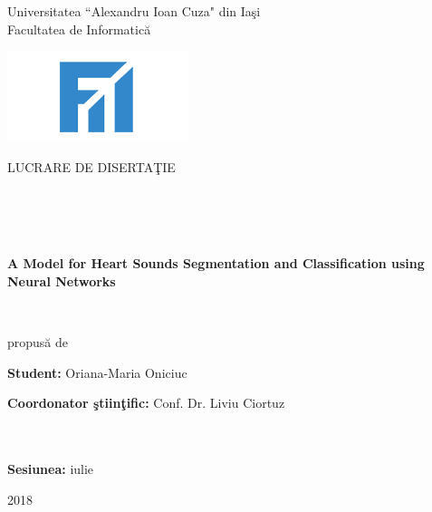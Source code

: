 \documentclass[11pt, a4papper]{report}
\theoremstyle{plain}
\theoremstyle{definition}
\theoremstyle{definition}
\theoremstyle{proposition}
\begin{document}
\begin{titlepage}

\begin{center}
\begin{large}
Universitatea ``Alexandru Ioan Cuza" din Iaşi\\
Facultatea de Informatică\\
\end{large}
\end{center}

\vspace{50mm}

\begin{center}
\includegraphics{fii.png}
\end{center}
 
\vspace{15mm}

\begin{center}
\begin{Large}
LUCRARE DE DISERTAŢIE
\end{Large}
\\
\
\\
\
\

\begin{Huge}
\textbf{A Model for Heart Sounds Segmentation and
Classification using Neural Networks}
\end{Huge}

\

propusă de

\end{center}

\vspace{30mm}

\textbf{Student:} Oriana-Maria Oniciuc

\textbf{Coordonator ştiinţific:} Conf. Dr. Liviu Ciortuz
\\
\
\\
\


\vfill

\begin{center}
\textbf{Sesiunea:} iulie

2018
\end{center}

\end{titlepage}
\newpage
\end{document}
